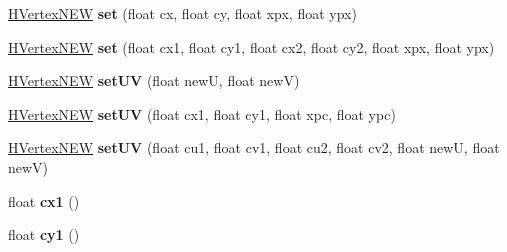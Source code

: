 \begin{DoxyCompactItemize}
\item 
\hypertarget{classhype_1_1extended_1_1util_1_1_h_vertex_n_e_w_acf9ada7ff792a9b9faa788d741752227}{\hyperlink{classhype_1_1extended_1_1util_1_1_h_vertex_n_e_w}{H\-Vertex\-N\-E\-W} {\bfseries set} (float cx, float cy, float xpx, float ypx)}\label{classhype_1_1extended_1_1util_1_1_h_vertex_n_e_w_acf9ada7ff792a9b9faa788d741752227}

\item 
\hypertarget{classhype_1_1extended_1_1util_1_1_h_vertex_n_e_w_a5f626819ad0dbf21da4e702aa975a79f}{\hyperlink{classhype_1_1extended_1_1util_1_1_h_vertex_n_e_w}{H\-Vertex\-N\-E\-W} {\bfseries set} (float cx1, float cy1, float cx2, float cy2, float xpx, float ypx)}\label{classhype_1_1extended_1_1util_1_1_h_vertex_n_e_w_a5f626819ad0dbf21da4e702aa975a79f}

\item 
\hypertarget{classhype_1_1extended_1_1util_1_1_h_vertex_n_e_w_a6a572cdc1a06be7062ddd17998eb9d14}{\hyperlink{classhype_1_1extended_1_1util_1_1_h_vertex_n_e_w}{H\-Vertex\-N\-E\-W} {\bfseries set\-U\-V} (float new\-U, float new\-V)}\label{classhype_1_1extended_1_1util_1_1_h_vertex_n_e_w_a6a572cdc1a06be7062ddd17998eb9d14}

\item 
\hypertarget{classhype_1_1extended_1_1util_1_1_h_vertex_n_e_w_ad0d274079aa10f57fdf27d3b1a28c1f7}{\hyperlink{classhype_1_1extended_1_1util_1_1_h_vertex_n_e_w}{H\-Vertex\-N\-E\-W} {\bfseries set\-U\-V} (float cx1, float cy1, float xpc, float ypc)}\label{classhype_1_1extended_1_1util_1_1_h_vertex_n_e_w_ad0d274079aa10f57fdf27d3b1a28c1f7}

\item 
\hypertarget{classhype_1_1extended_1_1util_1_1_h_vertex_n_e_w_aa029739c35dfe24d08d73e944b78dc28}{\hyperlink{classhype_1_1extended_1_1util_1_1_h_vertex_n_e_w}{H\-Vertex\-N\-E\-W} {\bfseries set\-U\-V} (float cu1, float cv1, float cu2, float cv2, float new\-U, float new\-V)}\label{classhype_1_1extended_1_1util_1_1_h_vertex_n_e_w_aa029739c35dfe24d08d73e944b78dc28}

\item 
\hypertarget{classhype_1_1extended_1_1util_1_1_h_vertex_n_e_w_ae4702835b314dc611c78e9593793bfa0}{float {\bfseries cx1} ()}\label{classhype_1_1extended_1_1util_1_1_h_vertex_n_e_w_ae4702835b314dc611c78e9593793bfa0}

\item 
\hypertarget{classhype_1_1extended_1_1util_1_1_h_vertex_n_e_w_a3da81edf04eaba722bf3f182d2747447}{float {\bfseries cy1} ()}\label{classhype_1_1extended_1_1util_1_1_h_vertex_n_e_w_a3da81edf04eaba722bf3f182d2747447}


\end{DoxyCompactItemize}
